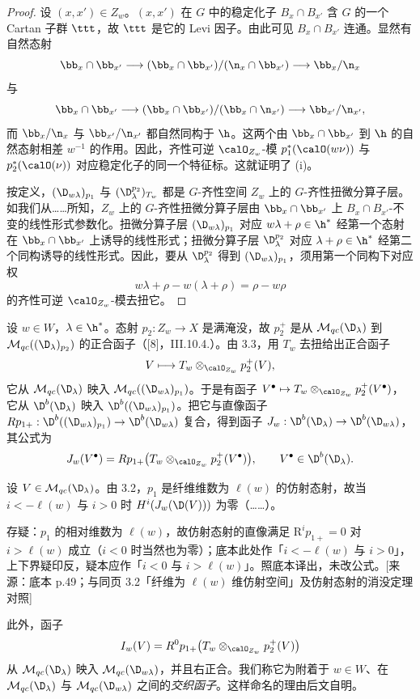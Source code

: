 \begin{proof}
设 $(x,x')\in Z_w$。$(x,x')$ 在 $G$ 中的稳定化子 $B_x\cap B_{x'}$ 含 $G$ 的一个 Cartan 子群 $\ttt$，故 $\ttt$ 是它的 Levi 因子。由此可见 $B_x\cap B_{x'}$ 连通。显然有自然态射
$$\bb_x\cap\bb_{x'}\longrightarrow(\bb_x\cap\bb_{x'})/(\n_x\cap\bb_{x'})\longrightarrow\bb_x/\n_x$$
与
$$\bb_x\cap\bb_{x'}\longrightarrow(\bb_x\cap\bb_{x'})/(\bb_x\cap\n_{x'})\longrightarrow\bb_{x'}/\n_{x'},$$
而 $\bb_x/\n_x$ 与 $\bb_{x'}/\n_{x'}$ 都自然同构于 $\h$。这两个由 $\bb_x\cap\bb_{x'}$ 到 $\h$ 的自然态射相差 $w^{-1}$ 的作用。因此，齐性可逆 $\calO_{Z_w}$-模 $p_1^*(\calO(w\nu))$ 与 $p_2^*(\calO(\nu))$ 对应稳定化子的同一个特征标。这就证明了 (i)。

按定义，$(\D_{w\lambda})_{p_1}$ 与 $(\D^{p_2}_\lambda)_{T_w}$ 都是 $G$-齐性空间 $Z_w$ 上的 $G$-齐性扭微分算子层。如我们从……所知，$Z_w$ 上的 $G$-齐性扭微分算子层由 $\bb_x\cap\bb_{x'}$ 上 $B_x\cap B_{x'}$-不变的线性形式参数化。扭微分算子层 $(\D_{w\lambda})_{p_1}$ 对应 $w\lambda+\rho\in\h^*$ 经第一个态射在 $\bb_x\cap\bb_{x'}$ 上诱导的线性形式；扭微分算子层 $\D^{p_2}_\lambda$ 对应 $\lambda+\rho\in\h^*$ 经第二个同构诱导的线性形式。因此，要从 $\D^{p_2}_\lambda$ 得到 $(\D_{w\lambda})_{p_1}$，须用第一个同构下对应权
$$w\lambda+\rho-w(\lambda+\rho)=\rho-w\rho$$
的齐性可逆 $\calO_{Z_w}$-模去扭它。
\end{proof}

设 $w\in W$，$\lambda\in\h^*$。态射 $p_2:Z_w\to X$ 是满淹没，故 $p_2^+$ 是从 $\mathcal{M}_{qc}(\D_\lambda)$ 到 $\mathcal{M}_{qc}((\D_\lambda)_{p_2})$ 的正合函子（[8]，III.10.4.）。由 3.3，用 $T_w$ 去扭给出正合函子
$$V\longmapsto T_w\otimes_{\calO_{Z_w}}p_2^+(V),$$
它从 $\mathcal{M}_{qc}(\D_\lambda)$ 映入 $\mathcal{M}_{qc}((\D_{w\lambda})_{p_1})$。于是有函子 $V^\bullet\mapsto T_w\otimes_{\calO_{Z_w}}p_2^+(V^\bullet)$，它从 $\D^b(\D_\lambda)$ 映入 $\D^b((\D_{w\lambda})_{p_1})$。把它与直像函子 $Rp_{1+}:\D^b((\D_{w\lambda})_{p_1})\to\D^b(\D_{w\lambda})$ 复合，得到函子 $J_w:\D^b(\D_\lambda)\to\D^b(\D_{w\lambda})$，其公式为
$$J_w(V^\bullet)=Rp_{1+}\bigl(T_w\otimes_{\calO_{Z_w}}p_2^+(V^\bullet)\bigr),\qquad V^\bullet\in\D^b(\D_\lambda).$$

设 $V\in\mathcal{M}_{qc}(\D_\lambda)$。由 3.2，$p_1$ 是纤维维数为 $\ell(w)$ 的仿射态射，故当 $i<-\ell(w)$ 与 $i>0$ 时 $H^i(J_w(\D(V)))$ 为零（……）。
\begin{annote}
存疑：$p_1$ 的相对维数为 $\ell(w)$，故仿射态射的直像满足 $\mathrm{R}^ip_{1+}=0$ 对 $i>\ell(w)$ 成立（$i<0$ 时当然也为零）；底本此处作「$i<-\ell(w)$ 与 $i>0$」，上下界疑印反，疑本应作「$i<0$ 与 $i>\ell(w)$」。照底本译出，未改公式。[来源：底本 p.49；与同页 3.2「纤维为 $\ell(w)$ 维仿射空间」及仿射态射的消没定理对照]
\end{annote}
此外，函子
$$I_w(V)=R^0p_{1+}\bigl(T_w\otimes_{\calO_{Z_w}}p_2^+(V)\bigr)$$
从 $\mathcal{M}_{qc}(\D_\lambda)$ 映入 $\mathcal{M}_{qc}(\D_{w\lambda})$，并且右正合。我们称它为附着于 $w\in W$、在 $\mathcal{M}_{qc}(\D_\lambda)$ 与 $\mathcal{M}_{qc}(\D_{w\lambda})$ 之间的\emph{交织函子}。这样命名的理由后文自明。

